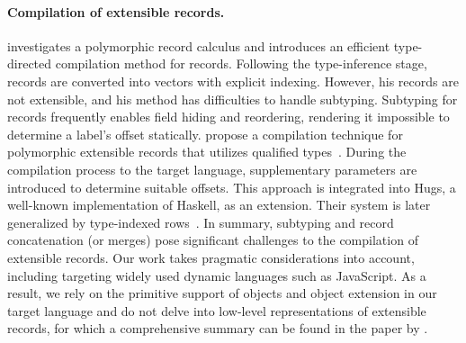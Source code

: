 \paragraph{Compilation of extensible records.}
\citet{ohori1995polymorphic} investigates a polymorphic record calculus and
introduces an efficient type-directed compilation method for records. Following
the type-inference stage, records are converted into vectors with explicit
indexing. However, his records are not extensible, and his method has
difficulties to handle subtyping. Subtyping for records frequently enables field
hiding and reordering, rendering it impossible to determine a label's offset
statically. \citet{gaster1996polymorphic} propose a compilation technique for
polymorphic extensible records that utilizes qualified
types~\citep{jones1994theory}. During the compilation process to the target
language, supplementary parameters are introduced to determine suitable offsets.
This approach is integrated into Hugs, a well-known implementation of Haskell,
as an extension. Their system is later generalized by type-indexed
rows~\citep{shields2001type}. In summary, subtyping and record concatenation (or
merges) pose significant challenges to the compilation of extensible records.
Our work takes pragmatic considerations into account, including targeting widely
used dynamic languages such as JavaScript. As a result, we rely on the primitive
support of objects and object extension in our target language and do not delve
into low-level representations of extensible records, for which a comprehensive
summary can be found in the paper by \citet{leijen2005extensible}.

